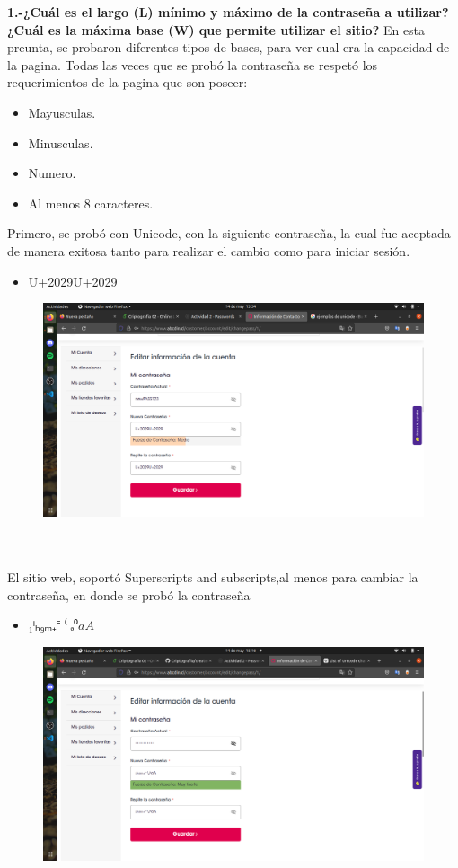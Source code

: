 \documentclass[]{article}
\begin{document}
\textbf{1.-¿Cuál es el largo (L) mínimo y máximo de la contraseña a utilizar? ¿Cuál es la máxima base (W) que permite utilizar el sitio? }
En esta preunta, se probaron diferentes tipos de bases, para ver cual era la capacidad de la pagina. Todas las veces que se probó la contraseña
se respetó los requerimientos de la pagina que son poseer: 

\begin{itemize}
    \item Mayusculas.
    \item Minusculas.
    \item Numero.
    \item Al menos 8 caracteres. 
\end{itemize}
Primero, se probó con Unicode, con la siguiente contraseña, la cual fue aceptada de manera exitosa tanto para realizar el cambio como para 
iniciar sesión.
\begin{itemize}
    \item U+2029U+2029
\end{itemize}

\begin{figure}
    \centering
    \includegraphics[width=15cm]{unicodecl.png}
\end{figure}
\\\\
El sitio web, soportó Superscripts and subscripts,al menos para cambiar la contraseña, en donde se probó la contraseña 
\begin{itemize}
    \item $₁ⁱₕ₉ₘ₊⁼⁽ₔ⁰aA$
\end{itemize}
\begin{figure}
    \centering
    \includegraphics[width=15cm]{superscriptscl.png}
\end{figure}
\end{document}
